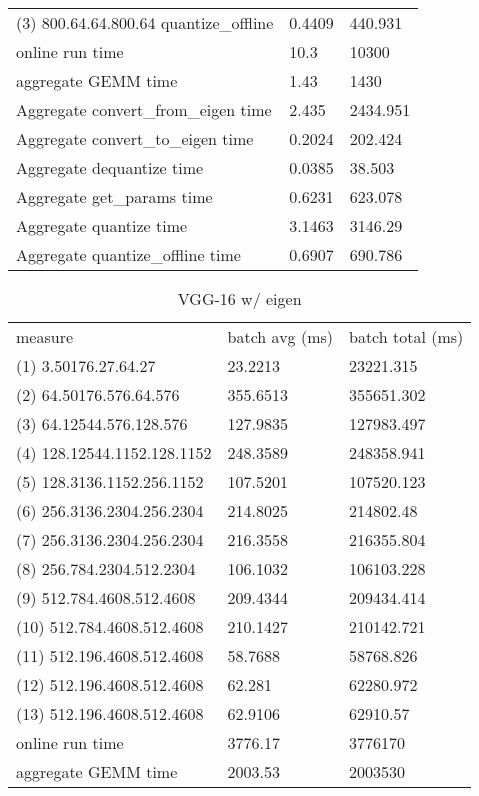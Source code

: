 \begin{longtable}{lll}
(3) 800.64.64.800.64 quantize\_offline     & 0.4409         & 440.931          \\
online run time                            & 10.3           & 10300            \\
aggregate GEMM time                        & 1.43           & 1430             \\
Aggregate convert\_from\_eigen time        & 2.435          & 2434.951         \\
Aggregate convert\_to\_eigen time          & 0.2024         & 202.424          \\
Aggregate dequantize time                  & 0.0385         & 38.503           \\
Aggregate get\_params time                 & 0.6231         & 623.078          \\
Aggregate quantize time                    & 3.1463         & 3146.29          \\
Aggregate quantize\_offline time           & 0.6907         & 690.786         
\end{longtable}

\begin{longtable}{lll}
\caption{VGG-16 w/ eigen}\\
measure                     & batch avg (ms) & batch total (ms) \\
(1) 3.50176.27.64.27        & 23.2213        & 23221.315        \\
(2) 64.50176.576.64.576     & 355.6513       & 355651.302       \\
(3) 64.12544.576.128.576    & 127.9835       & 127983.497       \\
(4) 128.12544.1152.128.1152 & 248.3589       & 248358.941       \\
(5) 128.3136.1152.256.1152  & 107.5201       & 107520.123       \\
(6) 256.3136.2304.256.2304  & 214.8025       & 214802.48        \\
(7) 256.3136.2304.256.2304  & 216.3558       & 216355.804       \\
(8) 256.784.2304.512.2304   & 106.1032       & 106103.228       \\
(9) 512.784.4608.512.4608   & 209.4344       & 209434.414       \\
(10) 512.784.4608.512.4608  & 210.1427       & 210142.721       \\
(11) 512.196.4608.512.4608  & 58.7688        & 58768.826        \\
(12) 512.196.4608.512.4608  & 62.281         & 62280.972        \\
(13) 512.196.4608.512.4608  & 62.9106        & 62910.57         \\
online run time             & 3776.17        & 3776170          \\
aggregate GEMM time         & 2003.53        & 2003530         
\end{longtable}

